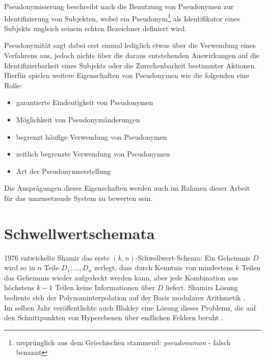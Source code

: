 \documentclass[
    fontsize=12pt,
    headings=small,
    parskip=half,           %
    bibliography=totoc,
    numbers=noenddot,       %
    open=any,               %
   final                   %
    ]{scrreprt}
\begin{document}
\label{sec_pseudonym}


Pseudonymisierung beschreibt nach \cite{pfitzmann2001, pfitzmann2010} die Benutzung von Pseudonymen zur Identifizierung von Subjekten, wobei ein Pseudonym\footnote{
	ursprünglich aus dem Griechischen stammend: \textit{pseudonumon} - falsch benannt
} als Identifikator eines Subjekts ungleich seinem echten Bezeichner definiert wird. 

Pseudonymität sagt dabei erst einmal lediglich etwas über die Verwendung eines Verfahrens aus, jedoch nichts über die daraus entstehenden Auswirkungen auf die Identifizierbarkeit eines Subjekts oder die Zurechenbarkeit bestimmter Aktionen. Hierfür spielen weitere Eigenschaften von Pseudonymen wie die folgenden eine Rolle:
\begin{itemize}
  \item garantierte Eindeutigkeit von Pseudonymen
  \item Möglichkeit von Pseudonymänderungen
  \item begrenzt häufige Verwendung von Pseudonymen
  \item zeitlich begrenzte Verwendung von Pseudonymen
  \item Art der Pseudonymserstellung
\end{itemize}

Die Ausprägungen dieser Eigenschaften werden auch im Rahmen dieser Arbeit für das umzusetzende System zu bewerten sein.

\section{Schwellwertschemata}

\label{sec_threshold}






1976 entwickelte Shamir das erste \((k,n)\)-Schwellwert-Schema: Ein Geheimnis \(D\) wird so in \(n\) Teile \(D_1, \dots, D_n\) zerlegt, dass durch Kenntnis von mindestens \(k\) Teilen das Geheimnis wieder aufgedeckt werden kann, aber jede Kombination aus höchstens \(k-1\) Teilen keine Informationen über \(D\) liefert. Shamirs Lösung bediente sich der Polynominterpolation auf der Basis modularer Arithmetik \cite{shamir1979}.\\
Im selben Jahr veröffentlichte auch Blakley eine Lösung dieses Problems, die auf den Schnittpunkten von Hyperebenen über endlichen Feldern beruht \cite{blakley1979}.
\end{document}
